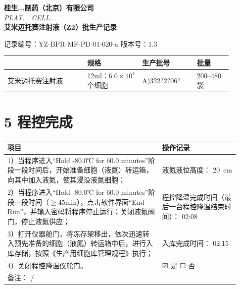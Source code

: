 \documentclass[UTF8,10pt,a4paper,fontset=fandol]{ctexart}
\newcommand{\fieldvalue}[1]{#1}
\newcommand{\handwritten}[1]{#1}
\newcommand{\checkboxfield}[1]{\ifstrequal{#1}{checked}{☑}{\ifstrequal{#1}{unclear}{?}{☐}}}
\begin{document}
\newpage

\begin{center}
\textbf{桂生...制药（北京）有限公司}\\
\textit{PLAT... CELL...}\\[2pt]
\textbf{艾米迈托赛注射液（Z2）批生产记录}
\end{center}

\noindent
记录编号：YZ-BPR-MF-PD-01-020-a\hfill
版本号：1.3

\begin{center}
\begin{tabular}{|p{0.32\linewidth}|p{0.22\linewidth}|p{0.22\linewidth}|p{0.14\linewidth}|}
\hline
 & 规格 & 生产批号 & 批量\\
\hline
艾米迈托赛注射液 &
12ml：$6.0\times10^{7}$个细胞 &
\fieldvalue{\handwritten{A)322?2?06?}} &
200--480 袋\\
\hline
\end{tabular}
\end{center}

\section*{5 程控完成}

\begin{tabular}{|p{0.62\linewidth}|p{0.31\linewidth}|}
\hline
\centering 项目 & \centering 操作记录\\
\hline
1）当程序进入“Hold -80.0℃ for 60.0 minutes”阶段一段时间后，开始准备细胞（液氮）转运箱，向其中加入液氮，使其浸没液氮细胞； &
液氮液位高度：
\fieldvalue{\handwritten{20}}\ cm\\
\hline
2）当程序进入“Hold -80.0℃ for 60.0 minutes”阶段一段时间（$\geq45$min），点击软件界面“End Run”，并输入密码将程序停止运行；关闭液氮阀门，停止液氮供应； &
程控降温完成时间（最后一台程控降温结束时间）：
\fieldvalue{\handwritten{02:08}}\\
\hline
3）打开仪器舱门，将冻存架移出，依次迅速转入预先准备的细胞（液氮）转运箱中后，进行入库存储，按照《生产用细胞库管理规程》执行； &
入库完成时间：
\fieldvalue{\handwritten{02:15}}\\
\hline
4）关闭程控降温仪舱门。 &
\fieldvalue{\handwritten{\checkboxfield{checked}}} 是
\quad
\fieldvalue{\checkboxfield{unchecked}} 否\\
\hline
备注：
\fieldvalue{\handwritten{/}} &\\
\hline
\end{tabular}
\end{document}
